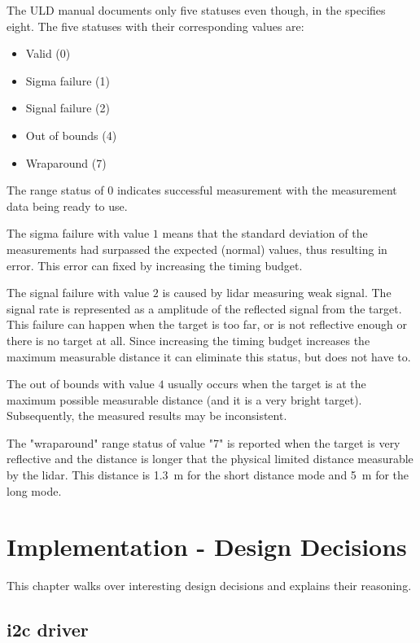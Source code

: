 \documentclass[
  digital,     %
  oneside,     %
  nosansbold,  %
  nocolorbold, %
  lof,         %
  lot,         %
]{fithesis4}
\begin{document}
The ULD manual \cite{um2510} documents only five statuses even though, in the \cite{vl53l1x} specifies eight. The five statuses with their corresponding values are:
\begin{itemize}
    \item Valid (0)
    \item Sigma failure (1)
    \item Signal failure (2)
    \item Out of bounds (4)
    \item Wraparound (7)
\end{itemize}

The range status of $0$ indicates successful measurement with the measurement data being ready to use.

The sigma failure with value $1$ means that the standard deviation of the measurements had surpassed the expected (normal) values, thus resulting in error. This error can fixed by increasing the timing budget.

The signal failure with value $2$ is caused by \acrshort{lidar} measuring weak signal. The signal rate is represented as a amplitude of the reflected signal from the target. This failure can happen when the target is too far, or is not reflective enough or there is no target at all. Since increasing the timing budget increases the maximum measurable distance it can eliminate this status, but does not have to.

The out of bounds with value $4$ usually occurs when the target is at the maximum possible measurable distance (and it is a very bright target). Subsequently, the measured results may be inconsistent.

The "wraparound" range status of value "7" is reported when the target is very reflective and the distance is longer that the physical limited distance measurable by the \acrshort{lidar}. This distance is \qty{1.3}{\metre} for the short distance mode and \qty{5}{\metre} for the long mode.

\chapter{ Implementation - Design Decisions }
This chapter walks over interesting design decisions and explains their reasoning.

\section[I2C driver]{\acrshort{i2c} driver}
\end{document}

